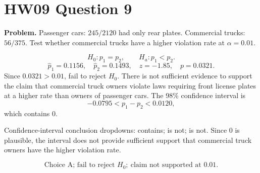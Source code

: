 \documentclass[11pt]{article}
\begin{document}
\section*{HW09 Question 9}

\textbf{Problem.} Passenger cars: \(245/2120\) had only rear plates. Commercial trucks: \(56/375\). Test whether commercial trucks have a higher violation rate at \(\alpha=0.01\).

\[
H_0:p_1=p_2,\qquad H_a:p_1<p_2.
\]
\[
\hat p_1=0.1156,\quad \hat p_2=0.1493,\quad z=-1.85,\quad p=0.0321.
\]
Since \(0.0321>0.01\), fail to reject \(H_0\). There is not sufficient evidence to support the claim that commercial truck owners violate laws requiring front license plates at a higher rate than owners of passenger cars. The 98\% confidence interval is
\[
-0.0795<p_1-p_2<0.0120,
\]
which contains 0.

Confidence-interval conclusion dropdowns: contains; is not; is not. Since 0 is plausible, the interval does not provide sufficient support that commercial truck owners have the higher violation rate.

\[
\boxed{\text{Choice A; fail to reject }H_0;\ \text{claim not supported at }0.01.}
\]
\end{document}
